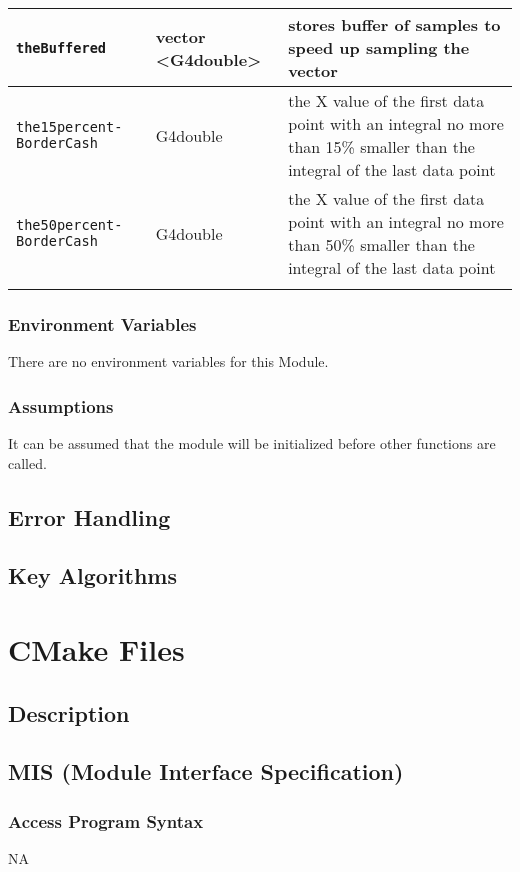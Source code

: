 \documentclass[12pt]{article}
\begin{document}
\begin{table}[h]
\begin{tabularx}{\textwidth}{p{}p{}p{}}
\texttt{theBuffered} & vector \textless G4double\textgreater & stores buffer of samples to speed up sampling the vector \\\hline
\texttt{the15percent- BorderCash} & G4double & the X value of the first data point with an integral no more than 15\% smaller than the integral of the last data point \\\hline
\texttt{the50percent- BorderCash} & G4double & the X value of the first data point with an integral no more than 50\% smaller than the integral of the last data point\\
\arrayrulecolor{black}
\bottomrule
\end{tabularx}
\end{table}
\clearpage
\subsubsection{Environment Variables}%
There are no environment variables for this Module.

\subsubsection{Assumptions}%
It can be assumed that the module will be initialized before other functions are called.

\subsection{Error Handling}

\subsection{Key Algorithms}

\section{CMake Files}
\subsection{Description}
\subsection{MIS (Module Interface Specification)}
\subsubsection{Access Program Syntax}%
NA
\end{document}
